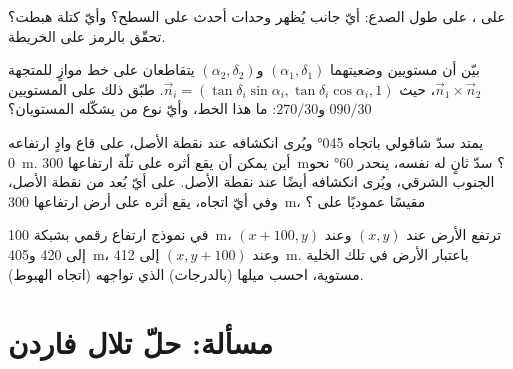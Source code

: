 \begin{exercise}[$\star\star$]\label{exo:b1:geological-maps:9}
على ، على طول الصدع: أيّ جانب يُظهر وحدات أحدث على السطح؟ وأيّ كتلة هبطت؟ تحقّق بالرمز على الخريطة.
\end{exercise}

\begin{exercise}[$\star\star\star$]\label{exo:b1:geological-maps:10}
بيّن أن مستويين وضعيتهما $(\alpha_1, \delta_1)$ و$(\alpha_2, \delta_2)$ يتقاطعان على خط موازٍ للمتجهة $\vec n_1 \times \vec n_2$، حيث $\vec n_i = (\tan\delta_i\sin\alpha_i,
\tan\delta_i\cos\alpha_i, 1)$. طبّق ذلك على المستويين $090/30$ و$270/30$: ما هذا الخط، وأيّ نوع من  يشكّله المستويان؟
\end{exercise}

\begin{exercise}[$\star\star\star$]\label{exo:b1:geological-maps:11}
يمتد سدّ شاقولي باتجاه \ang{045} ويُرى انكشافه عند نقطة الأصل، على قاع وادٍ ارتفاعه \qty{0}{m}. أين يمكن أن يقع أثره على تلّة ارتفاعها \qty{300}{m}؟ سدّ ثانٍ له  نفسه، ينحدر \ang{60} نحو الجنوب الشرقي، ويُرى انكشافه أيضًا عند نقطة الأصل. على أيّ بُعد من نقطة الأصل، وفي أيّ اتجاه، يقع أثره على أرض ارتفاعها \qty{300}{m}، مقيسًا عموديًا على ؟
\end{exercise}

\begin{exercise}[$\star\star\star$]\label{exo:b1:geological-maps:12}
في نموذج ارتفاع رقمي بشبكة \qty{100}{m}، ترتفع الأرض عند $(x, y)$ وعند $(x + 100, y)$ إلى 420 و\qty{405}{m}، وعند $(x, y + 100)$ إلى \qty{412}{m}. باعتبار الأرض في تلك الخلية مستوية، احسب ميلها (بالدرجات)  الذي تواجهه (اتجاه الهبوط).
\end{exercise}

\section{مسألة: حلّ تلال فاردن}


